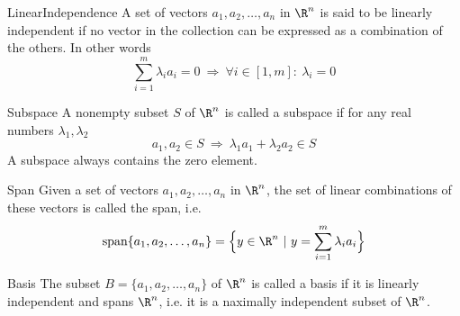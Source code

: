 \begin{theo}{LinearIndependence}
    A set of vectors $a_1, a_2, \ldots, a_n$ in $\R^n$ is said to be linearly independent if no vector in the collection can be expressed as a combination of the others. In other words
    \begin{equation*}
        \sum_{i=1}^m \lambda_i a_i = 0 \ \Rightarrow \ \forall i \in [1,m]: \ \lambda_i = 0
    \end{equation*}
    \vspace*{-0.5cm}
\end{theo}

\begin{theo}[Subspace]{Subspace}
    A nonempty subset $S$ of $\R^n$ is called a subspace if for any real numbers $\lambda_1, \lambda_2$
    \begin{equation*}
        a_1, a_2 \in S \ \Rightarrow \ \lambda_1 a_1 + \lambda_2 a_2 \in S
    \end{equation*}
    A subspace always contains the zero element.
\end{theo}

\begin{theo}[Span]{Span}
    Given a set of vectors $a_1, a_2, \ldots, a_n$ in $\R^n$, the set of linear combinations of these vectors is called the span, i\@.e\@.
    \begin{equation*}
        \text{span}\{a_1, a_2, \ldots, a_n\}  = \Big\{ y \in \R^n \ | \ y = \sum_{i=1}^m \lambda_i a_i \Big\}
    \end{equation*}
\end{theo}

\begin{theo}[Basis]{Basis}
    The subset $B = \{a_1, a_2, \ldots, a_n\}$ of $\R^n$ is called a basis if it is linearly independent and spans $\R^n$, i\@.e\@. it is a naximally independent subset of $\R^n$.
\end{theo}